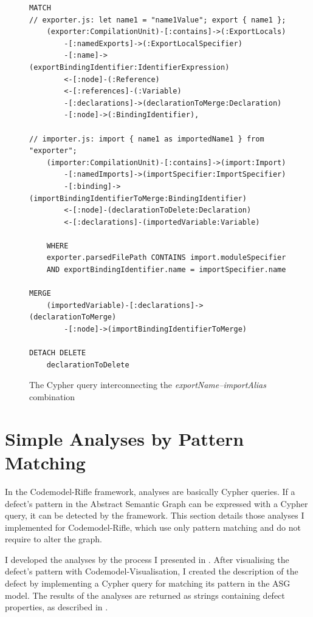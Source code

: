 \newpage
\vspace*{8.35em}
\begin{figure}[!h]
	\begin{lstlisting}[language=Cypher]
MATCH
// exporter.js: let name1 = "name1Value"; export { name1 };
    (exporter:CompilationUnit)-[:contains]->(:ExportLocals)
        -[:namedExports]->(:ExportLocalSpecifier)
        -[:name]->(exportBindingIdentifier:IdentifierExpression)
        <-[:node]-(:Reference)
        <-[:references]-(:Variable)
        -[:declarations]->(declarationToMerge:Declaration)
        -[:node]->(:BindingIdentifier),

// importer.js: import { name1 as importedName1 } from "exporter";
    (importer:CompilationUnit)-[:contains]->(import:Import)
        -[:namedImports]->(importSpecifier:ImportSpecifier)
        -[:binding]->(importBindingIdentifierToMerge:BindingIdentifier)
        <-[:node]-(declarationToDelete:Declaration)
        <-[:declarations]-(importedVariable:Variable)

    WHERE
    exporter.parsedFilePath CONTAINS import.moduleSpecifier
    AND exportBindingIdentifier.name = importSpecifier.name

MERGE
    (importedVariable)-[:declarations]->(declarationToMerge)
        -[:node]->(importBindingIdentifierToMerge)

DETACH DELETE
    declarationToDelete
	\end{lstlisting}
  \caption{The Cypher query interconnecting the \emph{exportName–importAlias} combination}
  \label{fig:export-import-example-cypher-source}
\end{figure}


\newpage
\section{Simple Analyses by Pattern Matching}

In the Codemodel-Rifle framework, analyses are basically Cypher queries. If a defect's pattern in the Abstract Semantic Graph can be expressed with a Cypher query, it can be detected by the framework. This section details those analyses I implemented for Codemodel-Rifle, which use only pattern matching and do not require to alter the graph.

I developed the analyses by the process I presented in . After visualising the defect's pattern with Codemodel-Visualisation, I created the description of the defect by implementing a Cypher query for matching its pattern in the ASG model. The results of the analyses are returned as strings containing defect properties, as described in .


